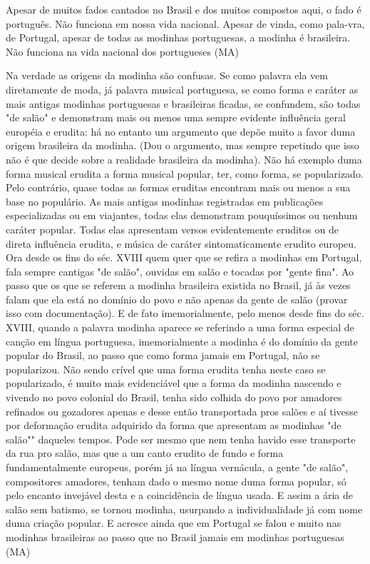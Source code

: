Apesar de muitos fados cantados no Brasil e dos muitos compostos aqui, o
fado é português. Não funciona em nossa vida nacional. Apesar de vinda,
como pala-vra, de Portugal, apesar de todas as modinhas portuguesas, a
modinha é brasileira. Não funciona na vida nacional dos portugueses (MA)

Na verdade as origens da modinha são confusas. Se como palavra ela vem
diretamente de moda, já palavra musical portuguesa, se como forma e
caráter as mais antigas modinhas portuguesas e brasileiras ficadas, se
confundem, são todas "de salão" e demonstram mais ou menos uma sempre
evidente influência geral européia e erudita: há no entanto um argumento
que depõe muito a favor duma origem brasileira da modinha. (Dou o
argumento, mas sempre repetindo que isso não é que decide sobre a
realidade brasileira da modinha). Não há exemplo duma forma musical
erudita a forma musical popular, ter, como forma, se popularizado. Pelo
contrário, quase todas as formas eruditas encontram mais ou menos a sua
base no populário. As mais antigas modinhas registradas em publicações
especializadas ou em viajantes, todas elas demonstram pouquíssimos ou
nenhum caráter popular. Todas elas apresentam versos evidentemente
eruditos ou de direta influência erudita, e música de caráter
sintomaticamente erudito europeu. Ora desde os fins do séc. XVIII quem
quer que se refira a modinhas em Portugal, fala sempre cantigas "de
salão", ouvidas em salão e tocadas por "gente fina". Ao passo que os que
se referem a modinha brasileira existida no Brasil, já às vezes falam
que ela está no domínio do povo e não apenas da gente de salão (provar
isso com documentação). E de fato imemorialmente, pelo menos desde fins
do séc. XVIII, quando a palavra modinha aparece se referindo a uma forma
especial de canção em língua portuguesa, imemorialmente a modinha é do
domínio da gente popular do Brasil, ao passo que como forma jamais em
Portugal, não se popularizou. Não sendo crível que uma forma erudita
tenha neste caso se popularizado, é muito mais evidenciável que a forma
da modinha nascendo e vivendo no povo colonial do Brasil, tenha sido
colhida do povo por amadores refinados ou gozadores apenas e desse então
transportada pros salões e aí tivesse por deformação erudita adquirido
da forma que apresentam as modinhas "de salão"" daqueles tempos. Pode
ser mesmo que nem tenha havido esse transporte da rua pro salão, mas que
a um canto erudito de fundo e forma fundamentalmente europeus, porém já
na língua vernácula, a gente "de salão", compositores amadores, tenham
dado o mesmo nome duma forma popular, só pelo encanto invejável desta e
a coincidência de língua usada. E assim a ária de salão sem batismo, se
tornou modinha, usurpando a individualidade já com nome duma criação
popular. E acresce ainda que em Portugal se falou e muito nas modinhas
brasileiras ao passo que no Brasil jamais em modinhas portuguesas (MA)

